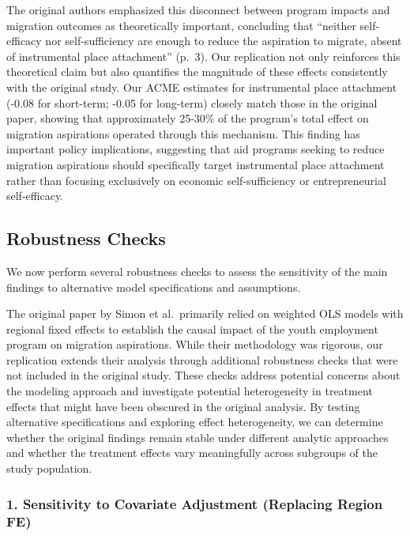 \documentclass[
]{article}
\begin{document}
The original authors emphasized this disconnect between program impacts
and migration outcomes as theoretically important, concluding that
``neither self-efficacy nor self-sufficiency are enough to reduce the
aspiration to migrate, absent of instrumental place attachment'' (p.~3).
Our replication not only reinforces this theoretical claim but also
quantifies the magnitude of these effects consistently with the original
study. Our ACME estimates for instrumental place attachment (-0.08 for
short-term; -0.05 for long-term) closely match those in the original
paper, showing that approximately 25-30\% of the program's total effect
on migration aspirations operated through this mechanism. This finding
has important policy implications, suggesting that aid programs seeking
to reduce migration aspirations should specifically target instrumental
place attachment rather than focusing exclusively on economic
self-sufficiency or entrepreneurial self-efficacy.

\subsection{Robustness Checks}\label{robustness-checks}

We now perform several robustness checks to assess the sensitivity of
the main findings to alternative model specifications and assumptions.

The original paper by Simon et al.~primarily relied on weighted OLS
models with regional fixed effects to establish the causal impact of the
youth employment program on migration aspirations. While their
methodology was rigorous, our replication extends their analysis through
additional robustness checks that were not included in the original
study. These checks address potential concerns about the modeling
approach and investigate potential heterogeneity in treatment effects
that might have been obscured in the original analysis. By testing
alternative specifications and exploring effect heterogeneity, we can
determine whether the original findings remain stable under different
analytic approaches and whether the treatment effects vary meaningfully
across subgroups of the study population.

\subsubsection{1. Sensitivity to Covariate Adjustment (Replacing Region
FE)}\label{sensitivity-to-covariate-adjustment-replacing-region-fe}
\end{document}
